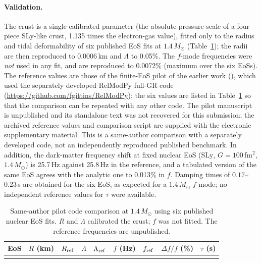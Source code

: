 \documentclass[11pt,a4paper]{article}
\newcommand{\Msun}{M_\odot}
\begin{document}
\paragraph{Validation.} The crust is a single calibrated parameter (the absolute pressure scale of a four-piece SLy-like crust, 1.135 times the electron-gas value), fitted only to the radius and tidal deformability of six published EoS fits at $1.4\,\Msun$ (Table~\ref{tab:valid}); the radii are then reproduced to 0.0006\,km and $\Lambda$ to 0.05\%. The $f$-mode frequencies were \emph{not} used in any fit, and are reproduced to 0.0072\% (maximum over the six EoSs). The reference values are those of the finite-EoS pilot of the earlier work (\citealt{HusainPilot}), which used the separately developed RelModPy full-GR code (\url{https://github.com/fgittins/RelModPy}); the six values are listed in Table~\ref{tab:valid} so that the comparison can be repeated with any other code. The pilot manuscript is unpublished and its standalone text was not recovered for this submission; the archived reference values and comparison script are supplied with the electronic supplementary material. This is a same-author comparison with a separately developed code, not an independently reproduced published benchmark. In addition, the dark-matter frequency shift at fixed nuclear EoS ($\mathrm{SLy}$, $G=100$\,fm$^2$, $1.4\,\Msun$) is 25.7\,Hz against 25.8\,Hz in the reference, and a tabulated version of the same EoS agrees with the analytic one to 0.013\% in $f$. Damping times of $0.17$--$0.23$\,s are obtained for the six EoS, as expected for a $1.4\,\Msun$ $f$-mode; no independent reference values for $\tau$ were available.
\begin{table}[htbp]\centering\small
\caption{Same-author pilot code comparison at $1.4\,\Msun$ using six published nuclear EoS fits. $R$ and $\Lambda$ calibrated the crust; $f$ was not fitted. The reference frequencies are unpublished.}\label{tab:valid}
\begin{tabular}{lrrrrrrrr}\toprule
EoS & $R$ (km) & $R_{\rm ref}$ & $\Lambda$ & $\Lambda_{\rm ref}$ & $f$ (Hz) & $f_{\rm ref}$ & $\Delta f/f$ (\%) & $\tau$ (s)\\\midrule
\\\bottomrule\end{tabular}\end{table}
\end{document}
